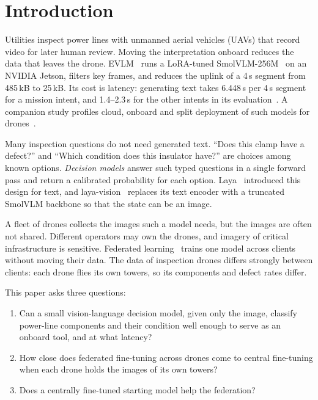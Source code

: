 \documentclass[preprint,12pt]{elsarticle}
\begin{document}
\section{Introduction}

Utilities inspect power lines with unmanned aerial vehicles (UAVs) that record video for later human review. Moving the interpretation onboard reduces the data that leaves the drone. EVLM~\cite{evlm} runs a LoRA-tuned SmolVLM-256M~\cite{smolvlm} on an NVIDIA Jetson, filters key frames, and reduces the uplink of a 4\,s segment from 485\,kB to 25\,kB. Its cost is latency: generating text takes 6.448\,s per 4\,s segment for a mission intent, and 1.4--2.3\,s for the other intents in its evaluation~\cite{evlm}. A companion study profiles cloud, onboard and split deployment of such models for drones~\cite{splitvlm}.

Many inspection questions do not need generated text. ``Does this clamp have a defect?'' and ``Which condition does this insulator have?'' are choices among known options. \emph{Decision models} answer such typed questions in a single forward pass and return a calibrated probability for each option. Laya~\cite{laya} introduced this design for text, and laya-vision~\cite{layavision} replaces its text encoder with a truncated SmolVLM backbone so that the state can be an image.

A fleet of drones collects the images such a model needs, but the images are often not shared. Different operators may own the drones, and imagery of critical infrastructure is sensitive. Federated learning~\cite{fedavg} trains one model across clients without moving their data. The data of inspection drones differs strongly between clients: each drone flies its own towers, so its components and defect rates differ.

This paper asks three questions:
\begin{enumerate}
\item Can a small vision-language decision model, given only the image, classify power-line components and their condition well enough to serve as an onboard tool, and at what latency?
\item How close does federated fine-tuning across drones come to central fine-tuning when each drone holds the images of its own towers?
\item Does a centrally fine-tuned starting model help the federation?
\end{enumerate}
\end{document}
